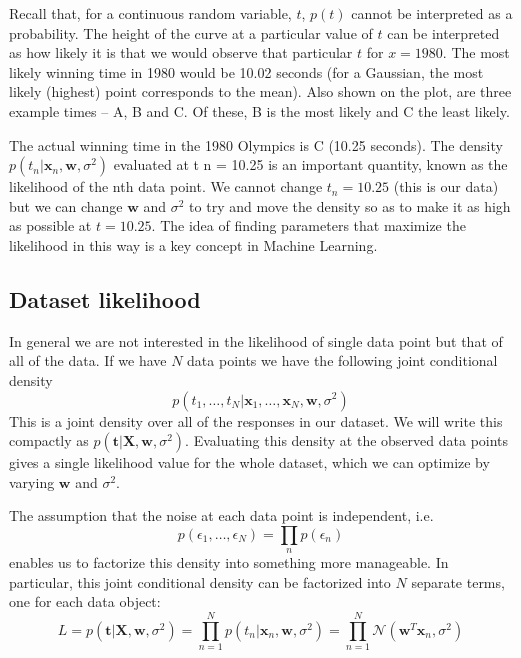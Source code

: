 Recall that, for a continuous random variable, $t$, $p(t)$ cannot be
interpreted as a probability. The height of the curve at a particular value of $t$ can be
interpreted as how likely it is that we would observe that particular $t$ for $x = 1980$.
The most likely winning time in 1980 would be 10.02 seconds (for a Gaussian, the
most likely (highest) point corresponds to the mean). Also shown on the plot, are
three example times – A, B and C. Of these, B is the most likely and C the least
likely.

The actual winning time in the 1980 Olympics is C (10.25 seconds).
The density $p(t_{n} | \mathbf{x}_n , \mathbf{w}, \sigma^2)$
evaluated at t n = 10.25 is an important quantity, known as the likelihood
of the nth data point. We cannot change $t_n = 10.25$ (this is our data) but
we can change $\mathbf{w}$ and $\sigma^2$ to try and move the density so as to make
it as high as possible at $t = 10.25$. The idea of finding parameters that maximize
the likelihood in this way is a key concept in Machine Learning.

\subsection{Dataset likelihood}

In general we are not interested in the likelihood of single data point but that of
all of the data. If we have $N$ data points we have the following joint conditional
density
\begin{equation*}
p(t_{1}, \ldots, t_{N} | \mathbf{x}_{1}, \ldots, \mathbf{x}_{N}, \mathbf{w}, \sigma^2)
\end{equation*}
This is a joint density over all of the responses in our dataset.
We will write this compactly
as $p( \mathbf{t} | \mathbf{X}, \mathbf{w}, \sigma^2)$.
Evaluating this density at the observed data points gives a single
likelihood value for the whole dataset, which we can optimize by varying $\mathbf{w}$
and $\sigma^2$.

The assumption that the noise at each data point is independent, i.e.
\begin{equation*}
p(\epsilon_{1}, \ldots, \epsilon_{N}) = \prod_{n} p(\epsilon_{n})
\end{equation*}
enables us to factorize this density into something more manageable. In
particular, this joint conditional density can be factorized into $N$ separate terms,
one for each data object:
\begin{equation}
L = p(\mathbf{t} | \mathbf{X},\mathbf{w},\sigma^2)
= \prod_{n=1}^{N} p(t_{n} | \mathbf{x}_{n},\mathbf{w},\sigma^2)
= \prod_{n=1}^{N} \mathcal{N}(\mathbf{w}^{T}\mathbf{x}_{n},\sigma^2)
\end{equation}

